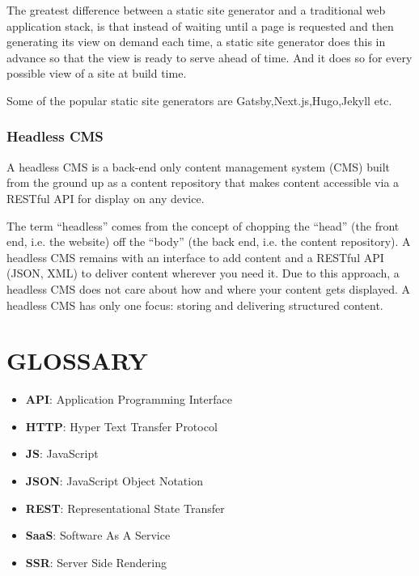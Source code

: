 \documentclass[12pt,a4paper,oneside]{report}
\begin{document}
\par 
The greatest difference between a static site generator and a traditional web application stack, is that instead of waiting until a page is requested and then generating its view on demand each time, a static site generator does this in advance so that the view is ready to serve ahead of time. And it does so for every possible view of a site at build time\cite{official}.

\par
Some of the popular static site generators are Gatsby,Next.js,Hugo,Jekyll etc.

\subsection{Headless CMS}
\par 
A headless CMS is a back-end only content management system (CMS) built from the ground up as a content repository that makes content accessible via a RESTful API for display on any device.

\par 
The term “headless” comes from the concept of chopping the “head” (the front end, i.e. the website) off the “body” (the back end, i.e. the content repository). A headless CMS remains with an interface to add content and a RESTful API (JSON, XML) to deliver content wherever you need it. Due to this approach, a headless CMS does not care about how and where your content gets displayed. A headless CMS has only one focus: storing and delivering structured content.


\chapter*{GLOSSARY}

\begin{itemize}[leftmargin=.5in, label={}]
    \item{\textbf{API}: Application Programming Interface}
    \item{\textbf{HTTP}: Hyper Text Transfer Protocol}
    \item{\textbf{JS}: JavaScript}
    \item{\textbf{JSON}: JavaScript Object Notation}
    \item{\textbf{REST}: Representational State Transfer}
    \item{\textbf{SaaS}: Software As A Service}
    \item{\textbf{SSR}: Server Side Rendering}
\end{itemize}
  
\end{document}
